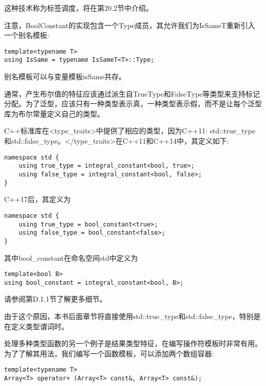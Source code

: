 这种技术称为标签调度，将在第20.2节中介绍。

注意，BoolConstant的实现包含一个Type成员，其允许我们为IsSameT重新引入一个别名模板:

\begin{lstlisting}[style=styleCXX]
template<typename T>
using IsSame = typename IsSameT<T>::Type;
\end{lstlisting}

别名模板可以与变量模板isSame共存。

通常，产生布尔值的特征应该通过派生自TrueType和FalseType等类型来支持标记分配。为了泛型，应该只有一种类型表示真，一种类型表示假，而不是让每个泛型库为布尔常量定义自己的类型。

C++标准库在<type\_traits>中提供了相应的类型，因为C++11: std::true\_type和std::false\_type。</type\_traits>在C++11和C++14中，其定义如下:

\begin{lstlisting}[style=styleCXX]
namespace std {
	using true_type = integral_constant<bool, true>;
	using false_type = integral_constant<bool, false>;
}
\end{lstlisting}

C++17后，其定义为

\begin{lstlisting}[style=styleCXX]
namespace std {
	using true_type = bool_constant<true>;
	using false_type = bool_constant<false>;
}
\end{lstlisting}

其中bool\_constant在命名空间std中定义为

\begin{lstlisting}[style=styleCXX]
template<bool B>
using bool_constant = integral_constant<bool, B>;
\end{lstlisting}

请参阅第D.1.1节了解更多细节。

由于这个原因，本书后面章节将直接使用std::true\_type和std::false\_type，特别是在定义类型谓词时。


处理多种类型函数的另一个例子是结果类型特征，在编写操作符模板时非常有用。为了了解其用法，我们编写一个函数模板，可以添加两个数组容器:

\begin{lstlisting}[style=styleCXX]
template<typename T>
Array<T> operator+ (Array<T> const&, Array<T> const&);
\end{lstlisting}

